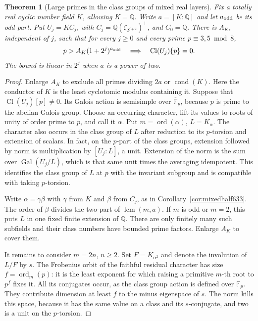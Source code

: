 \documentclass[a4paper,11pt]{article}
\newtheorem{theorem}[proposition]{Theorem}
\theoremstyle{definition}
\theoremstyle{remark}
\numberwithin{equation}{section}
\begin{document}
\begin{theorem}[Large primes in the class groups of mixed real layers]
\leavevmode\label{thm:mixedclasses634}
Fix a totally real cyclic number field \(K\), allowing \(K=\mathbb Q\).
Write \(a=[K:\mathbb Q]\) and let \(a_{\rm odd}\) be its odd part.
Put \(U_j=K C_j\), with \(C_j=\mathbb Q(\zeta_{2^{j+2}})^+\),
and \(C_0=\mathbb Q\). There is \(A_K\), independent of \(j\), such
that for every \(j\ge0\) and every prime \(p\equiv3,5\bmod8\),
\[
               p>A_K(1+2^j)^{a_{\rm odd}}
           \quad\Longrightarrow\quad
                    \operatorname{Cl}(U_j)\{p\}=0 .
\]
The bound is linear in \(2^j\) when \(a\) is a power of two.
\end{theorem}
\begin{proof}
Enlarge \(A_K\) to exclude all primes dividing \(2a\) or
\(\operatorname{cond}(K)\). Here the conductor of \(K\) is the
least cyclotomic modulus containing it. Suppose that
\(\operatorname{Cl}(U_j)[p]\ne0\). Its Galois action is semisimple
over \(\overline{\mathbb F}_p\), because \(p\) is prime to the
abelian Galois group. Choose an occurring character, lift its values
to roots of unity of order prime to \(p\), and call it \(\alpha\).
Put \(m=\operatorname{ord}(\alpha)\), \(L=K_\alpha\). The character
also occurs in the class group of \(L\) after reduction to its
\(p\)-torsion and extension of scalars. In fact, on the \(p\)-part
of the class groups, extension followed by norm is multiplication
by \([U_j:L]\), a unit. Extension of the norm is the sum over
\(\operatorname{Gal}(U_j/L)\), which is that same unit times the
averaging idempotent. This identifies the class group of \(L\) at
\(p\) with the invariant subgroup and is compatible with taking
\(p\)-torsion.

Write \(\alpha=\gamma\beta\) with \(\gamma\) from \(K\) and
\(\beta\) from \(C_j\), as in Corollary~\ref{cor:mixedhalf633}.
The order of \(\beta\) divides the two-part of
\(\operatorname{lcm}(m,a)\). If \(m\) is odd or \(m=2\), this
puts \(L\) in one fixed finite extension of \(\mathbb Q\). There
are only finitely many such subfields and their class numbers have
bounded prime factors. Enlarge \(A_K\) to cover them.

It remains to consider \(m=2n\), \(n\ge2\). Set \(F=K_{\alpha^2}\)
and denote the involution of \(L/F\) by \(s\). The Frobenius orbit
of the faithful residual character has size
\(f=\operatorname{ord}_m(p)\): it is the least exponent for which
raising a primitive \(m\)-th root to \(p^f\) fixes it. All its
conjugates occur, as the class group action is defined over
\(\mathbb F_p\). They contribute dimension at least \(f\) to the
minus eigenspace of \(s\). The norm kills this space, because it
has the same value on a class and its \(s\)-conjugate, and two is
a unit on the \(p\)-torsion.


\end{proof}
\end{document}
